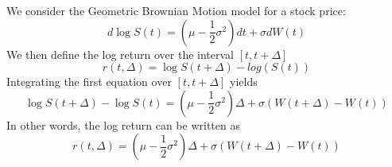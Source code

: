 \documentclass[12pt,twoside, letter]{exam}
\theoremstyle{definition}
\begin{document}
\par{We consider the Geometric Brownian Motion model for a stock price:}
\begin{equation*}
  d\log S(t) = (\mu - \frac{1}{2}\sigma^2)dt + \sigma dW(t)
\end{equation*}
We then define the log return over the interval $[t, t + \Delta]$
\begin{equation*}
  r(t, \Delta) = \log S(t+\Delta) - log(S(t))
\end{equation*}
Integrating the first equation over $[t, t + \Delta]$ yields
\begin{equation*}
  \log S(t + \Delta) - \log S(t) = (\mu - \frac{1}{2} \sigma^2) \Delta + \sigma(W(t + \Delta) - W(t))
\end{equation*}
In other words, the log return can be written as
\begin{equation*}
  r(t, \Delta) = (\mu - \frac{1}{2}\sigma^2)\Delta + \sigma(W(t + \Delta) - W(t))
\end{equation*}
\end{document}
